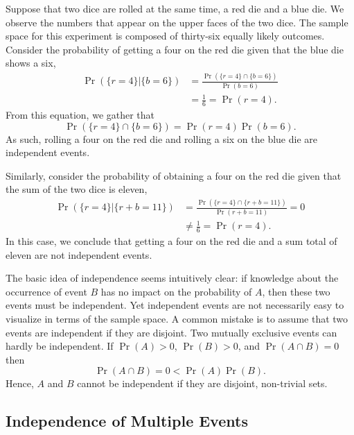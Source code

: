 \begin{example}
Suppose that two dice are rolled at the same time, a red die and a blue die.
We observe the numbers that appear on the upper faces of the two dice.
The sample space for this experiment is composed of thirty-six equally likely outcomes.
Consider the probability of getting a four on the red die given that the blue die shows a six,
\begin{equation*}
\begin{split}
\Pr (\{ r=4 \} | \{ b=6 \})
&= \frac{ \Pr (\{ r=4 \} \cap \{ b=6 \}) }
{ \Pr ( b=6 ) } \\
&= \frac{1}{6} = \Pr ( r=4 ) .
\end{split}
\end{equation*}
From this equation, we gather that
\begin{equation*}
\Pr (\{ r=4 \} \cap \{ b=6 \})
= \Pr ( r=4 ) \Pr ( b=6 ) .
\end{equation*}
As such, rolling a four on the red die and rolling a six on the blue die are independent events.

Similarly, consider the probability of obtaining a four on the red die given that the sum of the two dice is eleven,
\begin{equation*}
\begin{split}
\Pr (\{ r=4 \} | \{ r+b=11 \})
&= \frac{ \Pr (\{ r=4 \} \cap \{ r+b=11 \}) }
{ \Pr ( r+b=11 ) } = 0 \\
&\neq \frac{1}{6} = \Pr ( r=4 ) .
\end{split}
\end{equation*}
In this case, we conclude that getting a four on the red die and a sum total of eleven are not independent events.
\end{example}

The basic idea of independence seems intuitively clear: if knowledge about the occurrence of event $B$ has no impact on the probability of $A$, then these two events must be independent.
Yet independent events are not necessarily easy to visualize in terms of the sample space.
A common mistake is to assume that two events are independent if they are disjoint.
Two mutually exclusive events can hardly be independent.
If $\Pr (A) > 0$, $\Pr (B) > 0$, and $\Pr (A \cap B) = 0$ then
\begin{equation*}
\Pr (A \cap B) = 0 < \Pr (A) \Pr(B).
\end{equation*}
Hence, $A$ and $B$ cannot be independent if they are disjoint, non-trivial sets.


\subsection{Independence of Multiple Events}

